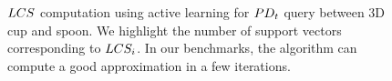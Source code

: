 \begin{figure}[htb]
\begin{center}
\caption[$\LCS$ computation using active learning for $\PDt$ query between 3D cup and spoon]{$\LCS$ computation using active learning for $\PDt$ query between 3D cup and spoon. We highlight the number of support vectors corresponding to $LCS_i$. In our benchmarks, the algorithm can compute a good approximation in a few iterations.}
\label{fig:2:LCSinActiveLearning3D}
\end{center}
\end{figure}


